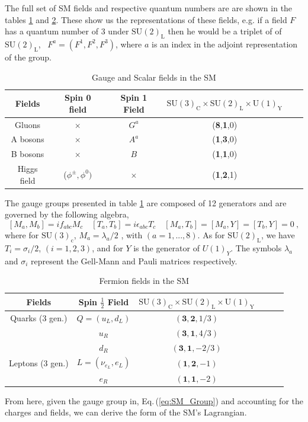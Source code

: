 \documentclass[10pt]{book}
\renewcommand{\(}{\left(}
\renewcommand{\)}{\right)}
\renewcommand{\[}{\left[}
\renewcommand{\]}{\right]}
\begin{document}
The full set of SM fields and respective quantum numbers are are shown in the tables \ref{table1} and \ref{table2}. These show us the representations of these fields, e.g. if a field $F$ has a quantum number of 3 under $\mathrm{SU(2)_L}$ then he would be a triplet of of $\mathrm{SU(2)_L}$, \ $F^a = (F^1,F^2,F^3)$, where $a$ is an index in the adjoint representation of the group.   
%
\begin{table}[H]
\centering
\caption{Gauge and Scalar fields in the SM}
\label{table1}
\begin{tabular}{@{}cccccc@{}}
  \hline	
 Fields & Spin 0 field & Spin 1 Field & $ \mathrm{ SU(3)_C \times SU(2)_L \times U(1)_Y } $  \\
  \hline	
 Gluons  & $\times$  & $G^a$ & (\textbf{8},\textbf{1},0) \\	
A bosons & $\times$  & $A^a$ & (\textbf{1},\textbf{3},0)   \\
B bosons & $\times$  & $B$   & (\textbf{1},\textbf{1},0)   \\
Higgs field & ($\phi^\pm, \phi^0 )$  & $\times$ & (\textbf{1},\textbf{2},1) \\ \hline
\end{tabular}
\end{table}
%
The gauge groups presented in table \ref{table1} are composed of 12 generators and are governed by the following algebra, 
% 
\begin{equation}
\left[ M_a , M_b \right] = i f_{abc} M_c \quad \left[ T_a , T_b \right ] = i \epsilon_{abc} T_c \quad \left[ M_a , T_b \right] = \left[ M_a , Y \right] = \left[ T_b,Y \right] = 0  \ , 
\end{equation}
%
where for $\mathrm{SU(3)_c}$, $M_a = {\lambda_a}/{2}$ , with $(a = 1, . . . , 8)$. As for $\mathrm{SU(2)_L}$, we have $T_i= \sigma_i/{2} $, $(i = 1, 2, 3)$, and for $Y$ is the generator of $U(1)_Y$. The symbols $\lambda_a$ and $\sigma_i$ represent the Gell-Mann and Pauli matrices respectively. 
%
\begin{table}[H]
\centering
\caption{Fermion fields in the SM}
\label{table2}
\begin{tabular}{@{}cccccc@{}}
  \hline	
 Fields & Spin $\frac{1}{2}$ Field & $\mathrm{ SU(3)_C \times SU(2)_L \times U(1)_Y} $   \\
  \hline	
Quarks (3 gen.) & $Q=(u_L,d_L)$ & $(\mathbf{3},\mathbf{2},{1}/{3})$ \\	
$\quad$        & $u_R$ & $(\mathbf{3},\mathbf{1},{4}/{3})$   \\
$\quad$   & $d_R$ & $(\mathbf{3},\mathbf{1}, -{2}/{3})$   \\
Leptons (3 gen.) & $L=(\nu_{e_L}, e_L )$ & $(\mathbf{1},\mathbf{2},-1)$  \\
$\quad$   & $e_R$ & $(\mathbf{1},\mathbf{1},-2)   $ \\ \hline
%
\end{tabular}
\end{table}
%
From here, given the gauge group in, Eq.\,(\ref{eq:SM_Group}) and accounting for the charges and fields, we can derive the form of the SM's Lagrangian. 
\end{document}
